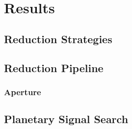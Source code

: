 \chapter{Results}
\label{chap:results}

\section{Reduction Strategies}


\section{Reduction Pipeline}



\subsection{Aperture}






\section{Planetary Signal Search}


\iffalse
Detrending algorithms with \textit{K2} are getting better with time, and the planet recovery rate are getting higher. It would be interesting to see how \textit{K2} compares with \textit{Kepler}. Understanding how different detrending algorithm fares, and what are the good setup for the knobs for each algorithm is something we will learn with time, and this can be seen as better quality of light curves are being extracted for later campaigns compared to earlier. The data challenges with \textit{K2} has helped in creating a host of new tools and techniques, whose utility is not likely to be limited to astronomy.
\fi

